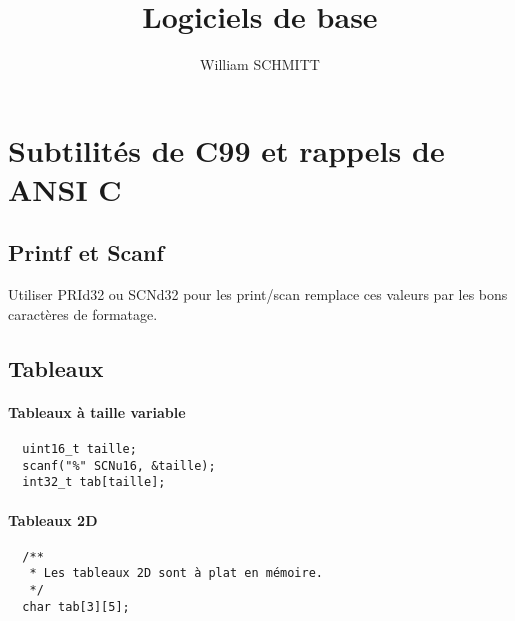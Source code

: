 \documentclass{article}
\title{Logiciels de base}
\author{William SCHMITT}
\begin{document}
\maketitle

\section{Subtilités de C99 et rappels de ANSI C}

\subsection{Printf et Scanf}

Utiliser PRId32 ou SCNd32 pour les print/scan remplace ces valeurs par les bons
caractères de formatage.

\subsection{Tableaux}

\paragraph{Tableaux à taille variable}
\begin{verbatim}
  uint16_t taille;
  scanf("%" SCNu16, &taille);
  int32_t tab[taille];
\end{verbatim}

\paragraph{Tableaux 2D}
\begin{verbatim}
  /**
   * Les tableaux 2D sont à plat en mémoire.
   */
  char tab[3][5];
\end{verbatim}
\end{document}
